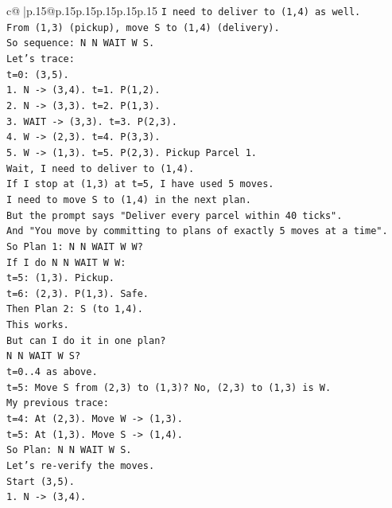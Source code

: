 \documentclass{article}
\begin{document}
{\begin{supertabular}{c@{$\;$}|p{.15\linewidth}@{}p{.15\linewidth}p{.15\linewidth}p{.15\linewidth}p{.15\linewidth}p{.15\linewidth}}
{{{\texttt{I need to deliver to (1,4) as well.} \\
\texttt{From (1,3) (pickup), move S to (1,4) (delivery).} \\
\texttt{So sequence: N N WAIT W S.} \\
\texttt{Let's trace:} \\
\texttt{t=0: (3,5).} \\
\texttt{1. N {-}> (3,4). t=1. P(1,2).} \\
\texttt{2. N {-}> (3,3). t=2. P(1,3).} \\
\texttt{3. WAIT {-}> (3,3). t=3. P(2,3).} \\
\texttt{4. W {-}> (2,3). t=4. P(3,3).} \\
\texttt{5. W {-}> (1,3). t=5. P(2,3). Pickup Parcel 1.} \\
\texttt{Wait, I need to deliver to (1,4).} \\
\texttt{If I stop at (1,3) at t=5, I have used 5 moves.} \\
\texttt{I need to move S to (1,4) in the next plan.} \\
\texttt{But the prompt says "Deliver every parcel within 40 ticks".} \\
\texttt{And "You move by committing to plans of exactly 5 moves at a time".} \\
\texttt{So Plan 1: N N WAIT W W?} \\
\texttt{If I do N N WAIT W W:} \\
\texttt{t=5: (1,3). Pickup.} \\
\texttt{t=6: (2,3). P(1,3). Safe.} \\
\texttt{Then Plan 2: S (to 1,4).} \\
\texttt{This works.} \\
\texttt{But can I do it in one plan?} \\
\texttt{N N WAIT W S?} \\
\texttt{t=0..4 as above.} \\
\texttt{t=5: Move S from (2,3) to (1,3)? No, (2,3) to (1,3) is W.} \\
\texttt{My previous trace:} \\
\texttt{t=4: At (2,3). Move W {-}> (1,3).} \\
\texttt{t=5: At (1,3). Move S {-}> (1,4).} \\
\texttt{So Plan: N N WAIT W S.} \\
\texttt{Let's re{-}verify the moves.} \\
\texttt{Start (3,5).} \\
\texttt{1. N {-}> (3,4).} \\
}}}
\end{supertabular}}
\end{document}
